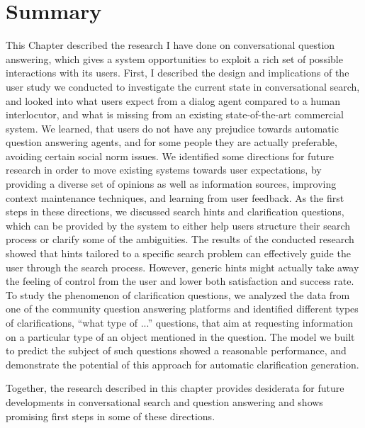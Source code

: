 
\section{Summary}
\label{section:conversation:summary}

This Chapter described the research I have done on conversational question answering, which gives a system opportunities to exploit a rich set of possible interactions with its users.
First, I described the design and implications of the user study we conducted to investigate the current state in conversational search, and looked into what users expect from a dialog agent compared to a human interlocutor, and what is missing from an existing state-of-the-art commercial system.
We learned, that users do not have any prejudice towards automatic question answering agents, and for some people they are actually preferable, avoiding certain social norm issues.
We identified some directions for future research in order to move existing systems towards user expectations, by providing a diverse set of opinions as well as information sources, improving context maintenance techniques, and learning from user feedback.
As the first steps in these directions, we discussed search hints and clarification questions, which can be provided by the system to either help users structure their search process or clarify some of the ambiguities.
The results of the conducted research showed that hints tailored to a specific search problem can effectively guide the user through the search process.
However, generic hints might actually take away the feeling of control from the user and lower both satisfaction and success rate.
To study the phenomenon of clarification questions, we analyzed the data from one of the community question answering platforms and identified different types of clarifications, \eg ``what type of ...'' questions, that aim at requesting information on a particular type of an object mentioned in the question.
The model we built to predict the subject of such questions showed a reasonable performance, and demonstrate the potential of this approach for automatic clarification generation.

Together, the research described in this chapter provides desiderata for future developments in conversational search and question answering and shows promising first steps in some of these directions.